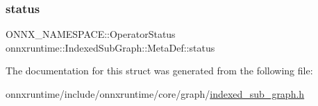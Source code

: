 \subsubsection{\texorpdfstring{status}{status}}
{\footnotesize\ttfamily O\+N\+N\+X\+\_\+\+N\+A\+M\+E\+S\+P\+A\+C\+E\+::\+Operator\+Status onnxruntime\+::\+Indexed\+Sub\+Graph\+::\+Meta\+Def\+::status}



The documentation for this struct was generated from the following file\+:\begin{DoxyCompactItemize}
\item 
onnxruntime/include/onnxruntime/core/graph/\mbox{\hyperlink{indexed__sub__graph_8h}{indexed\+\_\+sub\+\_\+graph.\+h}}\end{DoxyCompactItemize}
